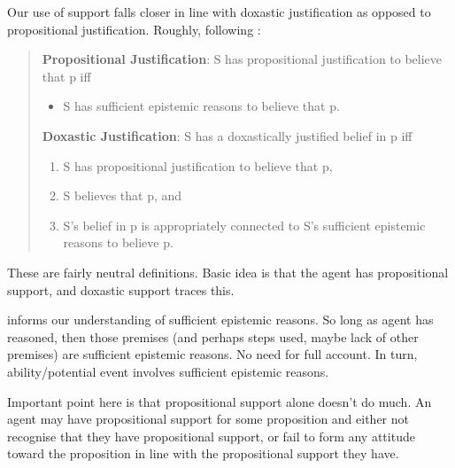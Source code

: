 \begin{note}
    Our use of support falls closer in line with doxastic justification as opposed to propositional justification.
  Roughly, following \textcite{Silva:2020aa}:

  \begin{quote}
    \textbf{Propositional Justification}: S has propositional justification to believe that p iff
    \begin{itemize}
    \item S has sufficient epistemic reasons to believe that p.
    \end{itemize}

    \textbf{Doxastic Justification}: S has a doxastically justified belief in p iff
    \begin{enumerate}[label=(\roman*), ref=(\roman*)]
    \item\label{dj:def:i} S has propositional justification to believe that p,
    \item\label{dj:def:ii} S believes that p, and
    \item\label{dj:def:iii} S's belief in p is appropriately connected to S's sufficient epistemic reasons to believe p.
    \end{enumerate}
  \end{quote}

  These are fairly neutral definitions.
  Basic idea is that the agent has propositional support, and doxastic support traces this.

  \bP{} informs our understanding of sufficient epistemic reasons.
  So long as agent has reasoned, then those premises (and perhaps steps used, maybe lack of other premises) are sufficient epistemic reasons.
  No need for full account.
  In turn, ability/potential event involves sufficient epistemic reasons.

  Important point here is that propositional support alone doesn't do much.
  An agent may have propositional support for some proposition and either not recognise that they have propositional support, or fail to form any attitude toward the proposition in line with the propositional support they have.
\end{note}

